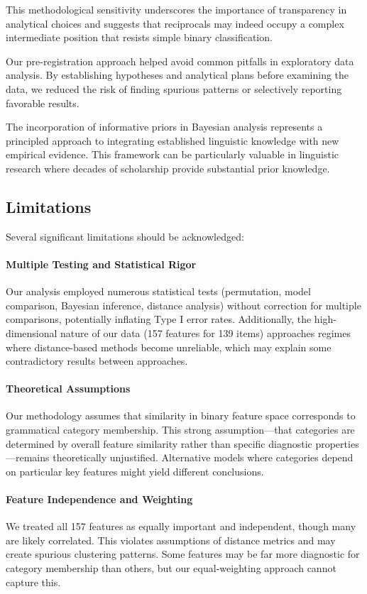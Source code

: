 \documentclass[12pt]{article}
\begin{document}
This methodological sensitivity underscores the importance of transparency in analytical choices and suggests that reciprocals may indeed occupy a complex intermediate position that resists simple binary classification.

Our pre-registration approach helped avoid common pitfalls in exploratory data analysis. By establishing hypotheses and analytical plans before examining the data, we reduced the risk of finding spurious patterns or selectively reporting favorable results.

The incorporation of informative priors in Bayesian analysis represents a principled approach to integrating established linguistic knowledge with new empirical evidence. This framework can be particularly valuable in linguistic research where decades of scholarship provide substantial prior knowledge.

\subsection{Limitations}

Several significant limitations should be acknowledged:

\paragraph{Multiple Testing and Statistical Rigor}
Our analysis employed numerous statistical tests (permutation, model comparison, Bayesian inference, distance analysis) without correction for multiple comparisons, potentially inflating Type I error rates. Additionally, the high-dimensional nature of our data (157 features for 139 items) approaches regimes where distance-based methods become unreliable, which may explain some contradictory results between approaches.

\paragraph{Theoretical Assumptions}
Our methodology assumes that similarity in binary feature space corresponds to grammatical category membership. This strong assumption—that categories are determined by overall feature similarity rather than specific diagnostic properties—remains theoretically unjustified. Alternative models where categories depend on particular key features might yield different conclusions.

\paragraph{Feature Independence and Weighting}
We treated all 157 features as equally important and independent, though many are likely correlated. This violates assumptions of distance metrics and may create spurious clustering patterns. Some features may be far more diagnostic for category membership than others, but our equal-weighting approach cannot capture this.
\end{document}
